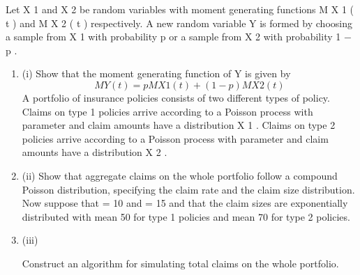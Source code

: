 \documentclass[a4paper,12pt]{article}
\begin{document}
Let X 1 and X 2 be random variables with moment generating functions M X 1 ( t ) and M X 2 ( t ) respectively. A new random variable Y is formed by choosing a sample from X 1 with probability p or a sample from X 2 with probability 1 − p .
\begin{enumerate}
\item (i)
Show that the moment generating function of Y is given by
\[M Y ( t ) = pM X 1 ( t ) + ( 1 − p ) M X 2 ( t )\]
\medskip 
A portfolio of insurance policies consists of two different types of policy. Claims on type 1 policies arrive according to a Poisson process with parameter  and claim amounts have a distribution X 1 . Claims on type 2 policies arrive according to a Poisson process with parameter  and claim amounts have a distribution X 2 .
\item (ii)
Show that aggregate claims on the whole portfolio follow a compound Poisson distribution, specifying the claim rate and the claim size distribution.
\medskip
Now suppose that  = 10 and  = 15 and that the claim sizes are exponentially distributed with mean 50 for type 1 policies and mean 70 for type 2 policies.
\item (iii)

Construct an algorithm for simulating total claims on the whole portfolio. 
\end{enumerate}
\newpage
\end{document}
